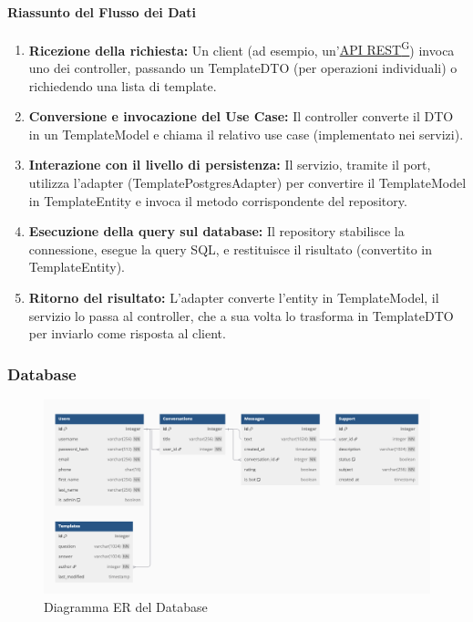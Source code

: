     \paragraph{Riassunto del Flusso dei Dati}
    \begin{enumerate}
        \item \textbf{Ricezione della richiesta:} Un client (ad esempio, un’\href{https://code7crusaders.github.io/docs/\href{https://code7crusaders.github.io/docs/PB/documentazione_interna/glossario.html#pb-product-baseline}{PB\textsuperscript{G}}/documentazione_interna/glossario.html#api-rest-representational-state-transfer}{API REST\textsuperscript{G}}) invoca uno dei controller, passando un TemplateDTO (per operazioni individuali) o richiedendo una lista di template.
        \item \textbf{Conversione e invocazione del Use Case:} Il controller converte il DTO in un TemplateModel e chiama il relativo use case (implementato nei servizi).
        \item \textbf{Interazione con il livello di persistenza:} Il servizio, tramite il port, utilizza l’adapter (TemplatePostgresAdapter) per convertire il TemplateModel in TemplateEntity e invoca il metodo corrispondente del repository.
        \item \textbf{Esecuzione della query sul database:} Il repository stabilisce la connessione, esegue la query SQL, e restituisce il risultato (convertito in TemplateEntity).
        \item \textbf{Ritorno del risultato:} L’adapter converte l’entity in TemplateModel, il servizio lo passa al controller, che a sua volta lo trasforma in TemplateDTO per inviarlo come risposta al client.
    \end{enumerate}
    
    \subsubsection{Database}
    \begin{figure}[H]
        \centering
        \includegraphics[width=\linewidth, height=0.8\textheight, keepaspectratio]{./img/DB_ER.png}
        \caption{Diagramma ER del Database}
        \label{fig:db_er}
    \end{figure}

